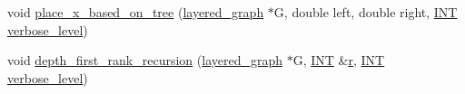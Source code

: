 \begin{DoxyCompactItemize}
void \mbox{\hyperlink{classgraph__node_a83a7a05169473dd6957146b735658857}{place\+\_\+x\+\_\+based\+\_\+on\+\_\+tree}} (\mbox{\hyperlink{classlayered__graph}{layered\+\_\+graph}} $\ast$G, double left, double right, \mbox{\hyperlink{galois_8h_a09fddde158a3a20bd2dcadb609de11dc}{I\+NT}} \mbox{\hyperlink{simeon_8_c_a818073fbcc2f439e7c56952f67386122}{verbose\+\_\+level}})
\item 
void \mbox{\hyperlink{classgraph__node_a491dc88828723c779c98510c61428df0}{depth\+\_\+first\+\_\+rank\+\_\+recursion}} (\mbox{\hyperlink{classlayered__graph}{layered\+\_\+graph}} $\ast$G, \mbox{\hyperlink{galois_8h_a09fddde158a3a20bd2dcadb609de11dc}{I\+NT}} \&\mbox{\hyperlink{alphabet2_8_c_acab531abaa74a7e664e3986f2522b33a}{r}}, \mbox{\hyperlink{galois_8h_a09fddde158a3a20bd2dcadb609de11dc}{I\+NT}} \mbox{\hyperlink{simeon_8_c_a818073fbcc2f439e7c56952f67386122}{verbose\+\_\+level}})
\end{DoxyCompactItemize}
